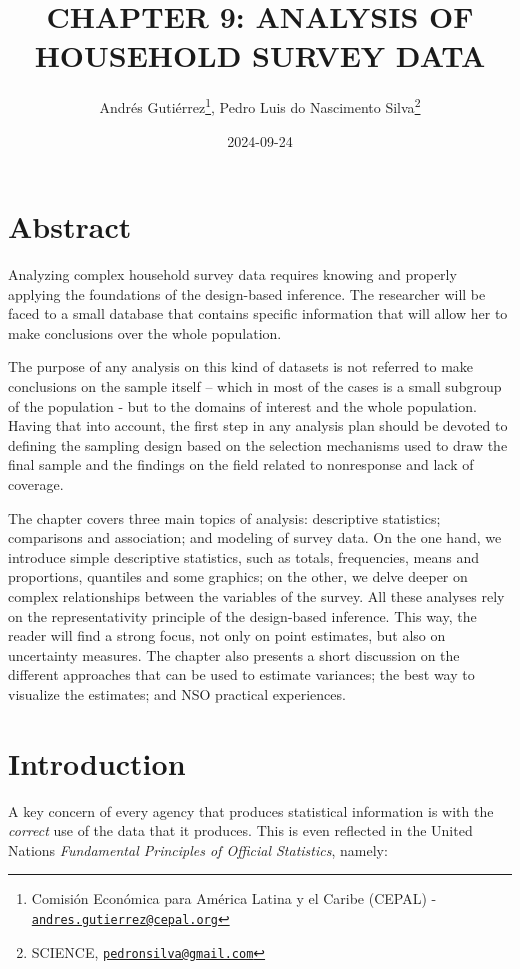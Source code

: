 \documentclass[
  12pt,
]{book}
\title{CHAPTER 9: ANALYSIS OF HOUSEHOLD SURVEY DATA}
\author{Andrés Gutiérrez\footnote{Comisión Económica para América Latina y el Caribe (CEPAL) - \href{mailto:andres.gutierrez@cepal.org}{\nolinkurl{andres.gutierrez@cepal.org}}}, Pedro Luis do Nascimento Silva\footnote{SCIENCE, \href{mailto:pedronsilva@gmail.com}{\nolinkurl{pedronsilva@gmail.com}}}}
\date{2024-09-24}
\begin{document}
\maketitle

{
\hypersetup{linkcolor=}
\setcounter{tocdepth}{0}
\tableofcontents
}
\listoffigures
\listoftables
\chapter*{Abstract}\label{abstract}

Analyzing complex household survey data requires knowing and properly applying the foundations of the design-based inference. The researcher will be faced to a small database that contains specific information that will allow her to make conclusions over the whole population.

The purpose of any analysis on this kind of datasets is not referred to make conclusions on the sample itself -- which in most of the cases is a small subgroup of the population - but to the domains of interest and the whole population. Having that into account, the first step in any analysis plan should be devoted to defining the sampling design based on the selection mechanisms used to draw the final sample and the findings on the field related to nonresponse and lack of coverage.

The chapter covers three main topics of analysis: descriptive statistics; comparisons and association; and modeling of survey data. On the one hand, we introduce simple descriptive statistics, such as totals, frequencies, means and proportions, quantiles and some graphics; on the other, we delve deeper on complex relationships between the variables of the survey. All these analyses rely on the representativity principle of the design-based inference. This way, the reader will find a strong focus, not only on point estimates, but also on uncertainty measures. The chapter also presents a short discussion on the different approaches that can be used to estimate variances; the best way to visualize the estimates; and NSO practical experiences.

\chapter*{Introduction}\label{introduction}

A key concern of every agency that produces statistical information is with the \emph{correct} use of the data that it produces. This is even reflected in the United Nations \emph{Fundamental Principles of Official Statistics}, namely:
\end{document}
